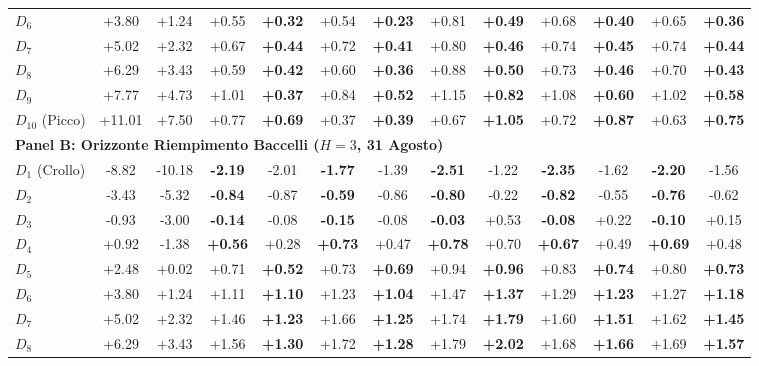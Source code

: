 \begin{table}[H]
\begin{tabular*}{\textwidth}{@{\extracolsep{\fill}} l cc cc cc cc cc cc @{}}
$D_{6}$ & +3.80 & +1.24 & +0.55 & \textbf{+0.32} & +0.54 & \textbf{+0.23} & +0.81 & \textbf{+0.49} & +0.68 & \textbf{+0.40} & +0.65 & \textbf{+0.36} \\
$D_{7}$ & +5.02 & +2.32 & +0.67 & \textbf{+0.44} & +0.72 & \textbf{+0.41} & +0.80 & \textbf{+0.46} & +0.74 & \textbf{+0.45} & +0.74 & \textbf{+0.44} \\
$D_{8}$ & +6.29 & +3.43 & +0.59 & \textbf{+0.42} & +0.60 & \textbf{+0.36} & +0.88 & \textbf{+0.50} & +0.73 & \textbf{+0.46} & +0.70 & \textbf{+0.43} \\
$D_{9}$ & +7.77 & +4.73 & +1.01 & \textbf{+0.37} & +0.84 & \textbf{+0.52} & +1.15 & \textbf{+0.82} & +1.08 & \textbf{+0.60} & +1.02 & \textbf{+0.58} \\
$D_{10}$ (Picco) & +11.01 & +7.50 & +0.77 & \textbf{+0.69} & +0.37 & \textbf{+0.39} & +0.67 & \textbf{+1.05} & +0.72 & \textbf{+0.87} & +0.63 & \textbf{+0.75} \\
\midrule
\multicolumn{13}{l}{\textbf{Panel B: Orizzonte Riempimento Baccelli ($H=3$, 31 Agosto)}} \\
\midrule
$D_{1}$ (Crollo) & -8.82 & -10.18 & \textbf{-2.19} & -2.01 & \textbf{-1.77} & -1.39 & \textbf{-2.51} & -1.22 & \textbf{-2.35} & -1.62 & \textbf{-2.20} & -1.56 \\
$D_{2}$ & -3.43 & -5.32 & \textbf{-0.84} & -0.87 & \textbf{-0.59} & -0.86 & \textbf{-0.80} & -0.22 & \textbf{-0.82} & -0.55 & \textbf{-0.76} & -0.62 \\
$D_{3}$ & -0.93 & -3.00 & \textbf{-0.14} & -0.08 & \textbf{-0.15} & -0.08 & \textbf{-0.03} & +0.53 & \textbf{-0.08} & +0.22 & \textbf{-0.10} & +0.15 \\
$D_{4}$ & +0.92 & -1.38 & \textbf{+0.56} & +0.28 & \textbf{+0.73} & +0.47 & \textbf{+0.78} & +0.70 & \textbf{+0.67} & +0.49 & \textbf{+0.69} & +0.48 \\
$D_{5}$ & +2.48 & +0.02 & +0.71 & \textbf{+0.52} & +0.73 & \textbf{+0.69} & +0.94 & \textbf{+0.96} & +0.83 & \textbf{+0.74} & +0.80 & \textbf{+0.73} \\
$D_{6}$ & +3.80 & +1.24 & +1.11 & \textbf{+1.10} & +1.23 & \textbf{+1.04} & +1.47 & \textbf{+1.37} & +1.29 & \textbf{+1.23} & +1.27 & \textbf{+1.18} \\
$D_{7}$ & +5.02 & +2.32 & +1.46 & \textbf{+1.23} & +1.66 & \textbf{+1.25} & +1.74 & \textbf{+1.79} & +1.60 & \textbf{+1.51} & +1.62 & \textbf{+1.45} \\
$D_{8}$ & +6.29 & +3.43 & +1.56 & \textbf{+1.30} & +1.72 & \textbf{+1.28} & +1.79 & \textbf{+2.02} & +1.68 & \textbf{+1.66} & +1.69 & \textbf{+1.57} \\

\end{tabular*}
\end{table}
